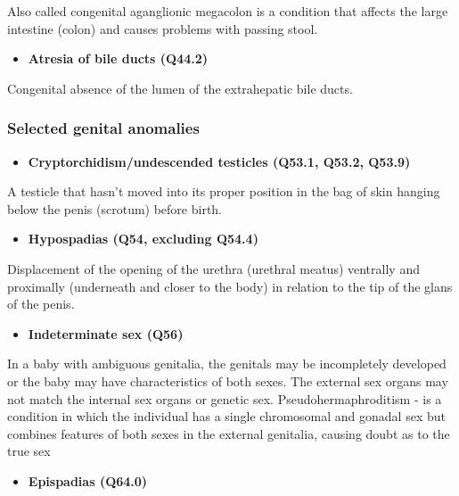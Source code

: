 \documentclass[
]{krantz}
\providecommand{\tightlist}{%
  \setlength{\itemsep}{0pt}\setlength{\parskip}{0pt}}
\begin{document}
Also called congenital aganglionic megacolon is a condition that affects the large intestine (colon) and causes problems with passing stool.

\begin{itemize}
\tightlist
\item
  \textbf{Atresia of bile ducts (Q44.2)}
\end{itemize}

Congenital absence of the lumen of the extrahepatic bile ducts.

\hypertarget{section2117}{%
\subsubsection{Selected genital anomalies}\label{section2117}}

\begin{itemize}
\tightlist
\item
  \textbf{Cryptorchidism/undescended testicles (Q53.1, Q53.2, Q53.9)}
\end{itemize}

A testicle that hasn't moved into its proper position in the bag of skin hanging below the penis (scrotum) before birth.

\begin{itemize}
\tightlist
\item
  \textbf{Hypospadias (Q54, excluding Q54.4)}
\end{itemize}

Displacement of the opening of the urethra (urethral meatus) ventrally and proximally (underneath and closer to the body) in relation to the tip of the glans of the penis.

\begin{itemize}
\tightlist
\item
  \textbf{Indeterminate sex (Q56)}
\end{itemize}

In a baby with ambiguous genitalia, the genitals may be incompletely developed or the baby may have characteristics of both sexes. The external sex organs may not match the internal sex organs or genetic sex. Pseudohermaphroditism - is a condition in which the individual has a single chromosomal and gonadal sex but combines features of both sexes in the external genitalia, causing doubt as to the true sex

\begin{itemize}
\tightlist
\item
  \textbf{Epispadias (Q64.0)}
\end{itemize}
\end{document}
